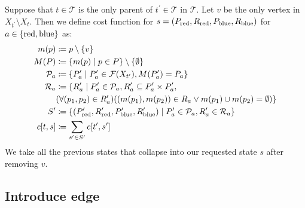 Suppose that \( t \in \mathcal{T} \) is
the only parent of \( t^\prime \in \mathcal{T} \) in \( \mathcal {T} \).
Let \( v \) be the only vertex in \( X_{t^\prime} \setminus X_t \).
Then we define cost function for \( s=(P_{\text{red}}, R_{\text{red}}, P_{\text{blue}}, R_{\text{blue}}) \)
for \( a \in \{\text{red}, \text{blue}\} \) as:
%
\begin{align}
	m(p)          & \coloneqq p \setminus \{v\}   \notag                                                                                                                    \\
	M(P)          & \coloneqq \{m(p) \mid p \in P \} \setminus \{\emptyset\}   \notag                                                                                       \\
	\mathcal{P}_a & \coloneqq \{ P_a^\prime \mid P_a^\prime \in \mathcal{F}(X_{t^\prime}), M(P_a^\prime) = P_a \}   \notag                                                  \\
	\mathcal{R}_a & \coloneqq \{ R_a^\prime \mid P_a^\prime \in \mathcal{P}_a, R_a^\prime \subseteq P_a^\prime \times P_a^\prime,   \notag                                  \\
	              & (\forall (p_1, p_2) \in R_a^\prime)((m(p_1), m(p_2)) \in R_a \lor m(p_1) \cup m(p_2) = \emptyset ) \}   \notag                                          \\
	S^\prime      & \coloneqq \{(P_{\text{red}}^\prime, R_{\text{red}}^\prime, P_{\text{blue}}^\prime, R_{\text{blue}}^\prime) \mid P_a^\prime \in \mathcal{P}_a, R_a^\prime \in \mathcal{R}_a  \}   \notag \\
	c[t, s]       & \coloneqq \sum_{s^\prime \in S^\prime} c[t^\prime, s^\prime]
\end{align}
%
We take all the previous states that collapse into our requested state \( s \)
after removing \( v \).

\subsection{Introduce edge}


